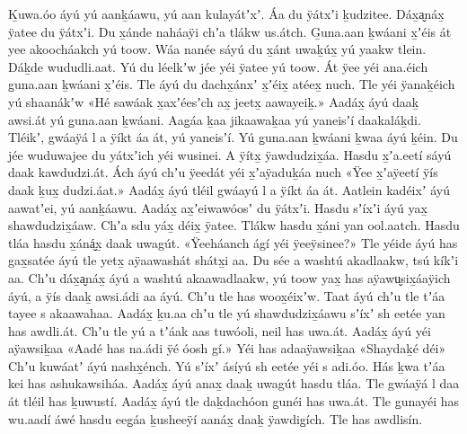 \clearpage
\begin{pairs}
\begin{Leftside}
\beginnumbering
\pstart
\noindent
{}Ḵuwa.óo áyú yú aanḵáawu, yú aan kulayátʼxʼ.
Áa du ÿátxʼi ḵudzitee.
Dáx̱a̬náx̱ ÿatee du ÿátxʼi.
Du x̱ánde naháaÿi chʼa tlákw us.átch.
G̱una.aan ḵwáani x̱ʼéis át yee akoocháakch yú toow.
Wáa nanée sáyú du x̱ánt uwaḵúx̱ yú yaakw tlein.
Dáḵde wududli.aat.
Yú du léelkʼw jée yéi ÿatee yú toow.
Át ÿee yéi ana.éich g̱una.aan ḵwáani x̱ʼéis.
Tle áyú du dachx̱ánxʼ x̱ʼéix̱ atéex̱ nuch.
Tle yéi ÿanaḵéich yú shaanákʼw
«\!Hé sawáak x̱a\-xʼéesʼch ax̱ jeetx̱ aawayeiḵ.\!»
\pend
\pstart
\hspace{-0.5em}Aadáx̱ áyú daaḵ awsi.át yú g̱una.aan ḵwáa\-ni.
Aag̱áa ḵaa jikaawaḵaa yú yaneisʼí daa\-kaláḵdi.
Tléikʼ, gwáaÿá l a ÿíkt áa át, yú yaneisʼí.
Yú g̱una.aan ḵwáani ḵwaa áyú ḵéin.
Du jée wuduwajee du yátxʼich yéi wusinei.
A ÿítx̱ ÿawdudzix̱áa.
Hasdu x̱ʼa.eetí sáyú daak kawdudzi.át.
Ách áyú chʼu ÿeedát yéi x̱ʼaÿaduḵáa nuch
«\!Ÿee x̱ʼaÿeetí ÿís daak ḵux̱ dudzi.áat.\!»
Aadáx̱ áyú tléil gwáayú l a ÿíkt áa át.
Aatlein kadéixʼ áyú aawatʼei, yú aanḵáawu.
Aadáx̱ ax̱ʼeiwawóosʼ du ÿátxʼi.
Hasdu sʼíxʼi áyú yax̱ shawdudzix̱áaw.
Chʼa sdu yáx̱ déix̱ ÿatee.
Tlákw hasdu x̱áni yan ool.aatch.
Has\-du tláa hasdu x̱áná̬x̱ daak uwagút.
«\!Ÿeeháanch ágí yéi ÿeeÿsinee?\!»
Tle yéide áyú has gax̱satée áyú tle yetx̱ aÿaa\-washát shátx̱i aa.
Du sée a washtú aka\-dlaakw, tsú kíkʼi aa.
Chʼu dáx̱a̬náx̱ áyú a washtú akaawadlaakw, yú toow yax̱ has aÿawu̬six̱áaÿich áyú, a ÿís daaḵ awsi.ádi aa áyú.
Chʼu tle has woox̱éixʼw.
Taat áyú chʼu tle tʼáa tayee s akaawahaa.
Aadáx̱ ḵu.aa chʼu tle yú shawdudzix̱áawu sʼíxʼ sh eetée yan has awdli.át.
Chʼu tle yú a tʼáak aas tuwóoli, neil has uwa.át.
\pend
\pstart
{}Aadáx̱ áyú yéi aÿawsiḵaa
«\!Aadé has na.ádi ÿé óosh gí.\!»
Yéi has adaaÿawsiḵaa
«\!Shaydaḵé déi\!»
Chʼu kuwáatʼ áyú nash\-x̱énch.
Yú sʼíxʼ ásíyú sh eetée yéi s adi.óo.
Hás ḵwa tʼáa kei has ashukawsiháa.
Aadáx̱ áyú anax̱ daaḵ uwagút hasdu tláa.
Tle gwáa\-ÿá l daa át tléil has ḵuwustí.
Aadáx̱ áyú tle daḵdachóon g̱unéi has uwa.át.
Tle g̱unayéi has wu.aadí áwé hasdu eeg̱áa ḵusheeÿí aanáx̱ daaḵ ÿawdig̱ích.
Tle has awdlisín.

\end{Leftside}
\end{pairs}
